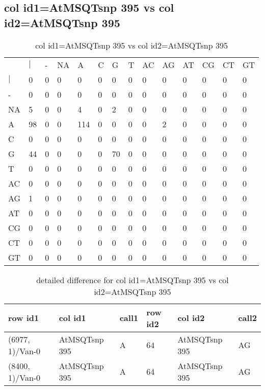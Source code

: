 \subsection{col id1=AtMSQTsnp 395 vs col id2=AtMSQTsnp 395}
\begin{center}
\begin{longtable}{|l|l|l|l|l|l|l|l|l|l|l|l|l|l|}
\caption{col id1=AtMSQTsnp 395 vs col id2=AtMSQTsnp 395} \label{table_dm902}\\
\hline
\\
\hline
&$|$&-&NA&A&C&G&T&AC&AG&AT&CG&CT&GT\\
$|$&0&0&0&0&0&0&0&0&0&0&0&0&0\\
-&0&0&0&0&0&0&0&0&0&0&0&0&0\\
NA&5&0&0&4&0&2&0&0&0&0&0&0&0\\
A&98&0&0&114&0&0&0&0&2&0&0&0&0\\
C&0&0&0&0&0&0&0&0&0&0&0&0&0\\
G&44&0&0&0&0&70&0&0&0&0&0&0&0\\
T&0&0&0&0&0&0&0&0&0&0&0&0&0\\
AC&0&0&0&0&0&0&0&0&0&0&0&0&0\\
AG&1&0&0&0&0&0&0&0&0&0&0&0&0\\
AT&0&0&0&0&0&0&0&0&0&0&0&0&0\\
CG&0&0&0&0&0&0&0&0&0&0&0&0&0\\
CT&0&0&0&0&0&0&0&0&0&0&0&0&0\\
GT&0&0&0&0&0&0&0&0&0&0&0&0&0\\
\hline
\end{longtable}
\end{center}

\begin{center}
\begin{longtable}{|l|l|l|l|l|l|}
\caption{detailed difference for col id1=AtMSQTsnp 395 vs col id2=AtMSQTsnp 395} \label{table_dm903}\\
\hline
row id1&col id1&call1&row id2&col id2&call2\\
\hline
(6977, 1)/Van-0&AtMSQTsnp 395&A&64&AtMSQTsnp 395&AG\\
(8400, 1)/Van-0&AtMSQTsnp 395&A&64&AtMSQTsnp 395&AG\\
\hline
\end{longtable}
\end{center}


